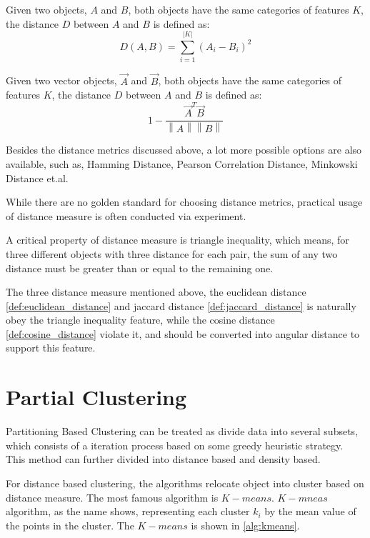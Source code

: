 \documentclass[utf8,english]{gradu3}
\begin{document}
\begin{definition}
	\label{def:euclidean_distance}
	Given two objects, $A$ and $B$, both objects have the same categories of features $K$, the distance $D$ between $A$ and $B$ is defined as:
	\[
	D\left(A,B\right) =
	\sum\limits_{i=1}^{\lvert  K\rvert } \left( 
		A_i - B_i
		\right)^2
\]
\end{definition}

\begin{definition}
	\label{def:cosine_distance}
	Given two vector objects, $ \overrightarrow{A}$ and $\overrightarrow{B}$, both objects have the same categories of features $K$, the distance $D$ between $A$ and $B$ is defined as:
	\[
	1- \frac{ \overrightarrow{A}^T \overrightarrow{B} }{\left \| A \right \| \left \| B \right \|}
	\]
\end{definition}

Besides the distance metrics discussed above, a lot more possible options are also available, such as, Hamming Distance, Pearson Correlation Distance, Minkowski Distance et.al. 

While there are no golden standard for choosing distance metrics, practical usage of distance measure is often conducted via experiment.

A critical property of distance measure is triangle inequality, which means, for three different objects with three distance for each pair, the sum of any two distance must be greater than or equal to the remaining one.

The three distance measure mentioned above, the euclidean distance \ref{def:euclidean_distance} and jaccard distance \ref*{def:jaccard_distance} is naturally obey the triangle inequality feature, while the cosine distance \ref*{def:cosine_distance} violate it, and should be converted into angular distance to support this feature.


\section{Partial Clustering}

Partitioning Based Clustering can be treated as divide data into several subsets, which consists of a iteration process based on some greedy heuristic strategy. This method can further divided into distance based and density based.

For distance based clustering, the algorithms relocate object into cluster based on distance measure. The most famous algorithm is $K-means$. $K-mneas$ algorithm, as the name shows, representing each cluster $k_i$ by the mean value of the points in the cluster. The $K-means$ is shown in \ref*{alg:kmeans}.
\end{document}
